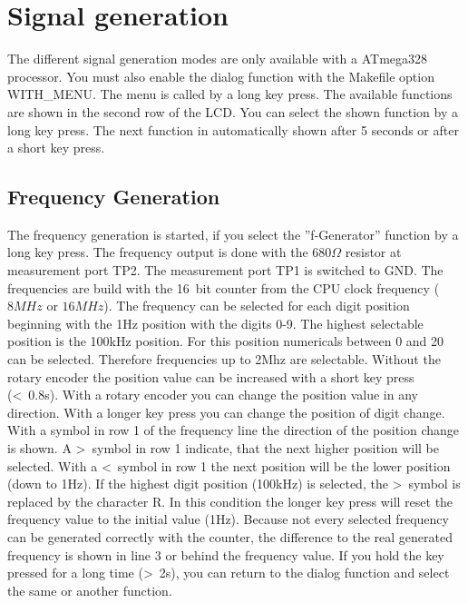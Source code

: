\chapter{Signal generation}

The different signal generation modes are only available with a ATmega328 processor.
You must also enable the dialog function with the Makefile option WITH\_MENU.
The menu is called by a long key press. The available functions are shown in the
second row of the LCD. You can select the shown function by a long key press.
The next function in automatically shown after 5 seconds or after a short key press.

\label{sec:generation}
\section{Frequency Generation}
The frequency generation is started, if you select the ''f-Generator'' function by
a long key press.
The frequency output is done with the \(680\Omega\) resistor at measurement port TP2.
The measurement port TP1 is switched to GND.
The frequencies are build with the 16~bit counter from the CPU clock frequency 
(\(8MHz\) or \(16MHz\)).
The frequency can be selected for each digit position beginning with the 1Hz position with the digits 0-9.
The highest selectable position is the 100kHz position. For this position numericals between 0 and 20 can be selected.
Therefore frequencies up to 2Mhz are selectable.
Without the rotary encoder the position value can be increased with a short key press (\textless~0.8s).
With a rotary encoder you can change the position value in any direction.
With a longer key press you can change the position of digit change.
With a symbol in row 1 of the frequency line the direction of the position change is shown. 
A \textgreater~symbol in row 1 indicate, that the next higher position will be selected.
With a \textless~symbol in row 1 the next position will be the lower position (down to 1Hz).
If the highest digit position (100kHz) is selected, the \textgreater~symbol is replaced by the character R.
In this condition the longer key press will reset the frequency value to the initial value (1Hz).
Because not every selected frequency can be generated correctly with the counter,
the difference to the real generated frequency is shown in line 3 or behind the frequency value.
If you hold the key pressed for a long time (\textgreater~2s), you can return to the dialog function and select
the same or another function.

